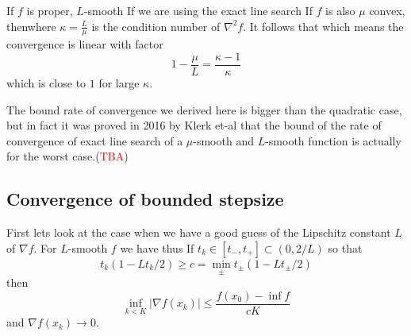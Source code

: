 \documentclass[a4paper]{mynotes}
\def\redd#1{\textcolor{red}{#1}}
\begin{document}
If $f$ is proper, $L$-smooth 
If we are using the exact line search  
If $f$ is also $\mu$ convex, %
thenwhere $\kappa=\frac{L}{\mu}$ is the condition number of $\nabla^2f$.
  It follows that
   which means
  the convergence is linear with factor $$1-\frac{\mu}{L}=\frac{\kappa-1}{\kappa}$$ which is close to $1$ for large $\kappa$.

The bound rate of convergence we derived here is bigger than the quadratic case, but in fact it was proved in 2016 by Klerk et-al \cite{taylor} that the bound of the rate of convergence of exact line search of a $\mu$-smooth and $L$-smooth function is actually  for the worst case.(\redd{TBA})

\subsection{Convergence of bounded stepsize} First lets look at the case when we have a good guess of the Lipschitz constant $L$ of $\nabla f$. For $L$-smooth $f$ we have
thus 
If $t_k\in [t_-,t_+]\subset (0,2/L)$ so that $$t_k(1-Lt_k/2)\ge c=\min_{\pm}  t_{\pm}(1-Lt_{\pm}/2)$$ then
$$\inf_{k<K} |\nabla f(x_k)|\le \frac{f(x_0)-\inf f}{cK}$$ 
and $\nabla f(x_k)\to 0$.
\end{document}
